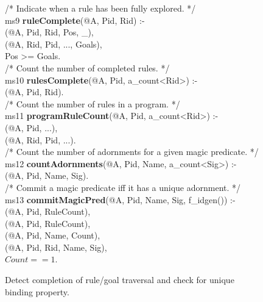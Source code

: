 \begin{figure}[!t]
\ssp
\centering
\begin{boxedminipage}{\linewidth}
/* Indicate when a rule has been fully explored. */ \\
ms9 {\bf ruleComplete}(@A, Pid, Rid) :- \\
(@A, Pid, Rid, Pos, \_), \\
(@A, Rid, Pid, ..., Goals), \\
\datalogspace Pos >= Goals. \\
	       
/* Count the number of completed rules. */ \\
ms10 {\bf rulesComplete}(@A, Pid, a\_count<Rid>) :- \\
(@A, Pid, Rid). \\
	        
/* Count the number of rules in a program. */ \\
ms11 {\bf programRuleCount}(@A, Pid, a\_count<Rid>) :- \\
(@A, Pid, ...), \\
(@A, Rid, Pid, ...). \\
	
/* Count the number of adornments for a given magic predicate. */ \\
ms12 {\bf countAdornments}(@A, Pid, Name, a\_count<Sig>) :- \\
(@A, Pid, Name, Sig). \\
	       
/* Commit a magic predicate iff it has a unique adornment. */ \\
ms13 {\bf commitMagicPred}(@A, Pid, Name, Sig, f\_idgen()) :- \\
(@A, Pid, RuleCount), \\
(@A, Pid, RuleCount), \\
(@A, Pid, Name, Count), \\
(@A, Pid, Rid, Name, Sig), \\
\datalogspace $Count == 1$.
\end{boxedminipage}
\caption{\label{ch:evita:fig:mpgoal}Detect completion of rule/goal traversal and check for unique binding property.}
\end{figure}


